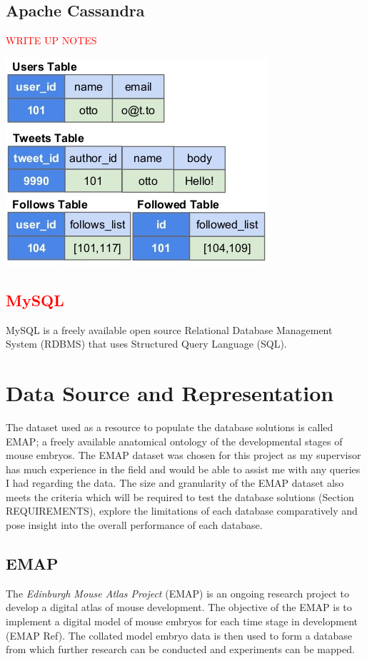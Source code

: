 \subsection{Apache Cassandra}\label{cassandra}
\textcolor{red}{WRITE UP NOTES}\begin{center}\includegraphics[width=0.75\linewidth]{images/cassandramodel}\end{center}

\textcolor{red}{\subsection{MySQL}\label{mysql}}
MySQL is a freely available open source Relational Database Management System (RDBMS) that uses Structured Query Language (SQL).

\section{Data Source and Representation}
The dataset used as a resource to populate the database solutions is called EMAP; a freely available anatomical ontology of the developmental stages of mouse embryos. The EMAP dataset was chosen for this project as my supervisor has much experience in the field and would be able to assist me with any queries I had regarding the data. The size and granularity of the EMAP dataset also meets the criteria which will be required to test the database solutions (Section REQUIREMENTS), explore the limitations of each database comparatively and pose insight into the overall performance of each database.

\subsection{EMAP}
The \textit{Edinburgh Mouse Atlas Project} (EMAP) is an ongoing research project to develop a digital atlas of mouse development. The objective of the EMAP is to implement a digital model of mouse embryos for each time stage in development (EMAP Ref). The collated model embryo data is then used to form a database from which further research can be conducted and experiments can be mapped.
 
